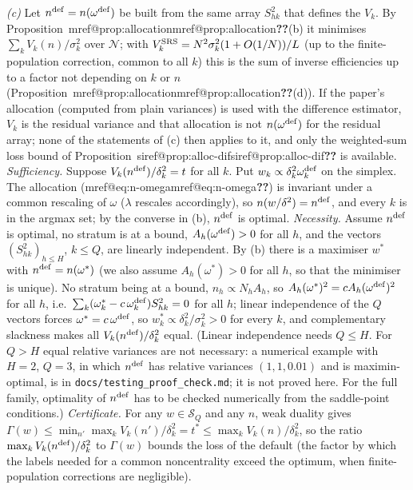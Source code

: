 \documentclass[pdflatex,sn-mathphys-num,iicol]{sn-jnl}
\makeatletter
\theoremstyle{thmstyleone}
\theoremstyle{thmstyletwo}
\theoremstyle{thmstylethree}
\newcommand{\SIref}[1]{\ifcsname siref@#1\endcsname\csname siref@#1\endcsname\else\textbf{??}\fi}
\newcommand{\Mref}[1]{\ifcsname mref@#1\endcsname\csname mref@#1\endcsname\else\textbf{??}\fi}
\makeatother
\begin{document}
\emph{(c)} Let $n^{\rm def}=n(\omega^{\rm def})$ be built from the same array $S^2_{hk}$ that defines the $V_k$. By Proposition~\Mref{prop:allocation}(b) it minimises $\sum_kV_k(n)/\sigma_k^2$ over $\mathcal N$; with $V^{\rm SRS}_k=N^2\sigma_k^2(1+O(1/N))/L$ (up to the finite-population correction, common to all $k$) this is the sum of inverse efficiencies up to a factor not depending on $k$ or $n$ (Proposition~\Mref{prop:allocation}(d)). If the paper's allocation (computed from plain variances) is used with the difference estimator, $V_k$ is the residual variance and that allocation is not $n(\omega^{\rm def})$ for the residual array; none of the statements of (c) then applies to it, and only the weighted-sum loss bound of Proposition~\SIref{prop:alloc-dif} is available. \emph{Sufficiency.} Suppose $V_k(n^{\rm def})/\delta_k^2=t$ for all $k$. Put $w_k\propto\delta_k^2\omega^{\rm def}_k$ on the simplex. The allocation (\Mref{eq:n-omega}) is invariant under a common rescaling of $\omega$ ($\lambda$ rescales accordingly), so $n(w/\delta^2)=n^{\rm def}$, and every $k$ is in the argmax set; by the converse in (b), $n^{\rm def}$ is optimal. \emph{Necessity.} Assume $n^{\rm def}$ is optimal, no stratum is at a bound, $A_h(\omega^{\rm def})>0$ for all $h$, and the vectors $(S^2_{hk})_{h\le H}$, $k\le Q$, are linearly independent. By (b) there is a maximiser $w^\ast$ with $n^{\rm def}=n(\omega^\ast)$ (we also assume $A_h(\omega^\ast)>0$ for all $h$, so that the minimiser is unique). No stratum being at a bound, $n_h\propto N_hA_h$, so $A_h(\omega^\ast)^2=cA_h(\omega^{\rm def})^2$ for all $h$, i.e.\ $\sum_k(\omega^\ast_k-c\,\omega^{\rm def}_k)S^2_{hk}=0$ for all $h$; linear independence of the $Q$ vectors forces $\omega^\ast=c\,\omega^{\rm def}$, so $w^\ast_k\propto\delta_k^2/\sigma_k^2>0$ for every $k$, and complementary slackness makes all $V_k(n^{\rm def})/\delta_k^2$ equal. (Linear independence needs $Q\le H$. For $Q>H$ equal relative variances are not necessary: a numerical example with $H=2$, $Q=3$, in which $n^{\rm def}$ has relative variances $(1,1,0.01)$ and is maximin-optimal, is in \texttt{docs/testing\_proof\_check.md}; it is not proved here. For the full family, optimality of $n^{\rm def}$ has to be checked numerically from the saddle-point conditions.) \emph{Certificate.} For any $w\in\mathcal S_Q$ and any $n$, weak duality gives $\Gamma(w)\le\min_{n'}\max_kV_k(n')/\delta_k^2=t^\ast\le\max_kV_k(n)/\delta_k^2$, so the ratio $\max_kV_k(n^{\rm def})/\delta_k^2$ to $\Gamma(w)$ bounds the loss of the default (the factor by which the labels needed for a common noncentrality exceed the optimum, when finite-population corrections are negligible).
\end{document}
